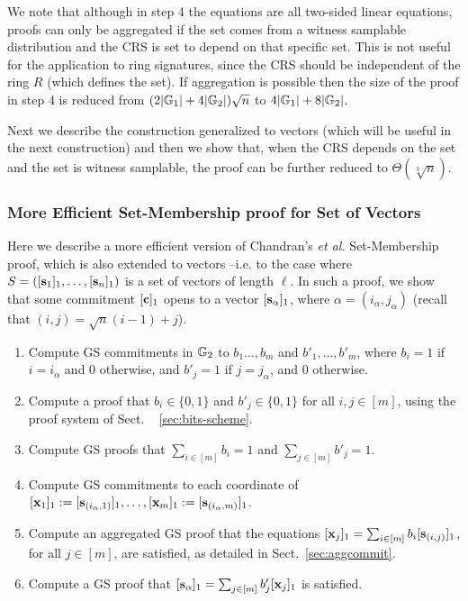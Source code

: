 We note that although in step 4 the equations are all two-sided linear equations, proofs can only be aggregated if the set comes from a witness samplable distribution and the CRS is set to depend on that specific set. 
This is not useful for the application 
to ring signatures, since the CRS should be independent of the ring $R$ (which defines the set). If aggregation is possible then the size of the proof in step 4 is reduced from $(2|\mathbb{G}_1|+4|\mathbb{G}_2|)\sqrt{n}$ to $4|\mathbb{G}_1|+8|\mathbb{G}_2|$.

Next we describe the construction generalized to vectors (which will be useful in the next construction) and then we show that,
when the CRS depends on the set and the set is witness samplable, the proof can be further reduced to $\Theta(\sqrt[3]{n})$.

\subsubsection{More Efficient Set-Membership proof for Set of Vectors}  
Here we describe a more efficient version of Chandran's \textit{et al.} Set-Membership proof,  
which is also extended to vectors --i.e. to the case where $S=([\mathbf{s}_1]_1,\ldots,[\mathbf{s}_n]_1)$ is a set of vectors of length $\ell$. In such a proof, we show that some commitment $[\mathbf{c}]_1$ opens to a vector $[\mathbf{s}_{\alpha}]_1$, where $\alpha=(i_\alpha,j_\alpha)$ (recall that $(i,j)=\sqrt{n}(i-1)+j$).

\begin{enumerate}
\item Compute GS commitments in $\mathbb{G}_2$ to $b_1\ldots,b_m$ and $b'_1,\ldots,b'_m$,
      where $b_i = 1$ if $i=i_\alpha$ and $0$ otherwise, and $b'_{j}=1$ if $j=j_\alpha$, and $0$ otherwise.
\item Compute a proof that $b_i \in \{0,1\}$ and $b'_j \in \{0,1\}$ for all $i,j\in[m]$, using the proof system of Sect.
~ \ref{sec:bits-scheme}.
\item Compute GS proofs that $\sum_{i\in[m]}b_i=1$ and $\sum_{j\in[m]}b'_j=1$. 
\item Compute GS commitments to each coordinate of $[\mathbf{x}_1]_1:=[\mathbf{s}_{(i_\alpha,1)}]_1,\ldots,[\mathbf{x}_m]_1:=[\mathbf{s}_{(i_\alpha,m)}]_1$.
\item Compute an aggregated GS proof that the equations $[\mathbf{x}_j]_1 = \sum_{i\in[m]}b_i[\mathbf{s}_{(i,j)}]_1$, for all $j\in[m]$, are satisfied, as detailed in Sect.~\ref{sec:aggcommit}.
\item Compute a GS proof that $[\mathbf{s}_{\alpha}]_1 = \sum_{j\in[m]}b'_j[\mathbf{x}_j]_1$ is satisfied.
\end{enumerate}

